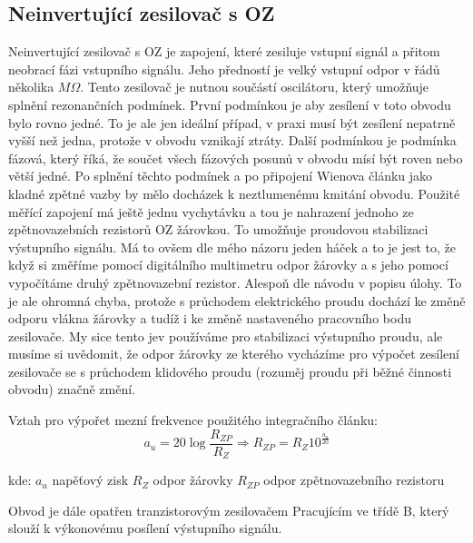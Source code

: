 		\subsection*{Neinvertující zesilovač s OZ}
			\indent\indent
			Neinvertující zesilovač s OZ je zapojení, které zesiluje vstupní signál a přitom neobrací fázi vstupního signálu. Jeho předností je velký vstupní odpor v řádů několika $M\Omega$. Tento zesilovač je nutnou součástí oscilátoru, který umožňuje splnění rezonančních podmínek. První podmínkou je aby zesílení v toto obvodu bylo rovno jedné. To je ale jen ideální případ, v praxi musí být zesílení nepatrně vyšší než jedna, protože v obvodu vznikají ztráty. Další podmínkou je podmínka fázová, který říká, že součet všech fázových posunů v obvodu mísí být roven nebo větší jedné. Po splnění těchto podmínek a po připojení Wienova článku jako kladné zpětné vazby by mělo docházek k neztlumenému kmitání obvodu. Použité měřící zapojení má ještě jednu vychytávku a tou je nahrazení jednoho ze zpětnovazebních rezistorů OZ žárovkou. To umožňuje proudovou stabilizaci výstupního signálu. Má to ovšem dle mého názoru jeden háček a to je jest to, že když si změříme pomocí digitálního multimetru odpor žárovky a s jeho pomocí vypočítáme  druhý zpětnovazební rezistor. Alespoň dle návodu v popisu úlohy. To je ale ohromná chyba, protože s průchodem elektrického proudu dochází ke změně odporu vlákna žárovky a tudíž i ke změně nastaveného pracovního bodu zesilovače. My sice tento jev používáme pro stabilizaci výstupního proudu, ale musíme si uvědomit, že odpor žárovky ze kterého vycházíme pro výpočet zesílení zesilovače se s průchodem klidového proudu (rozuměj proudu při běžné činnosti obvodu) značně změní.
			
			
			Vztah pro výpořet mezní frekvence použitého integračního článku:
			\begin{equation}
  				a_u = 20\log\frac{R_{ZP}}{R_Z} \Rightarrow R_{ZP} = R_Z 10^{\frac{a_u}{20}}
  			\end{equation}		
		
			\hspace*{2cm}kde:\newline    
  			\hspace*{4cm}$a_u$ \dotfill napěťový zisk\hspace*{4cm}\newline
	  		\hspace*{4cm}$R_Z$ \dotfill odpor žárovky\hspace*{4cm}\newline
	  		\hspace*{4cm}$R_{ZP}$ \dotfill odpor zpětnovazebního rezistoru\hspace*{4cm}\newline
  				
Obvod je dále opatřen tranzistorovým zesilovačem Pracujícím ve třídě B, který slouží k výkonovému posílení výstupního signálu.
  
  


